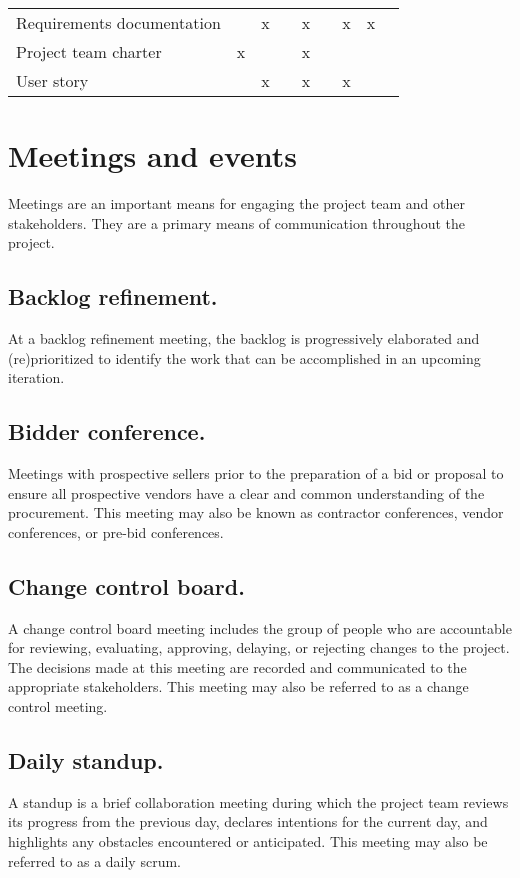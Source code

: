 \documentclass[11pt]{article}
\begin{document}
\begin{center}
\begin{tabular}{lllllllll}
Requirements documentation &  & x &  & x &  & x & x & \\
Project team charter & x &  &  & x &  &  &  & \\
User story &  & x &  & x &  & x &  & \\
\end{tabular}
\end{center}

\section{Meetings and events}
\label{sec:org9344505}
Meetings are an important means for engaging the project team and other stakeholders. They are a primary means of communication throughout the project.
\subsection{Backlog refinement.}
\label{sec:org8b1eba9}
At a backlog refinement meeting, the backlog is progressively elaborated and (re)prioritized to identify the work that can be accomplished in an upcoming iteration.
\subsection{Bidder conference.}
\label{sec:org6a455b0}
Meetings with prospective sellers prior to the preparation of a bid or proposal to ensure all prospective vendors have a clear and common understanding of the procurement. This meeting may also be known as contractor conferences, vendor conferences, or pre-bid conferences.
\subsection{Change control board.}
\label{sec:org193b4b4}
A change control board meeting includes the group of people
who are accountable for reviewing, evaluating, approving, delaying, or rejecting changes
to the project. The decisions made at this meeting are recorded and communicated to the appropriate stakeholders. This meeting may also be referred to as a change control meeting.
\subsection{Daily standup.}
\label{sec:org18496e5}
A standup is a brief collaboration meeting during which the project team reviews its progress from the previous day, declares intentions for the current day, and highlights any obstacles encountered or anticipated. This meeting may also be referred to as a daily scrum.
\end{document}
